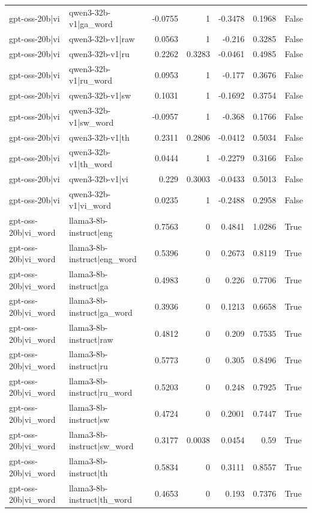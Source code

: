 \begin{table}
\begin{tabular}{l l r r r r l}
gpt-oss-20b|vi & qwen3-32b-v1|ga_word & -0.0755 & 1 & -0.3478 & 0.1968 & False \\
gpt-oss-20b|vi & qwen3-32b-v1|raw & 0.0563 & 1 & -0.216 & 0.3285 & False \\
gpt-oss-20b|vi & qwen3-32b-v1|ru & 0.2262 & 0.3283 & -0.0461 & 0.4985 & False \\
gpt-oss-20b|vi & qwen3-32b-v1|ru_word & 0.0953 & 1 & -0.177 & 0.3676 & False \\
gpt-oss-20b|vi & qwen3-32b-v1|sw & 0.1031 & 1 & -0.1692 & 0.3754 & False \\
gpt-oss-20b|vi & qwen3-32b-v1|sw_word & -0.0957 & 1 & -0.368 & 0.1766 & False \\
gpt-oss-20b|vi & qwen3-32b-v1|th & 0.2311 & 0.2806 & -0.0412 & 0.5034 & False \\
gpt-oss-20b|vi & qwen3-32b-v1|th_word & 0.0444 & 1 & -0.2279 & 0.3166 & False \\
gpt-oss-20b|vi & qwen3-32b-v1|vi & 0.229 & 0.3003 & -0.0433 & 0.5013 & False \\
gpt-oss-20b|vi & qwen3-32b-v1|vi_word & 0.0235 & 1 & -0.2488 & 0.2958 & False \\
gpt-oss-20b|vi_word & llama3-8b-instruct|eng & 0.7563 & 0 & 0.4841 & 1.0286 & True \\
gpt-oss-20b|vi_word & llama3-8b-instruct|eng_word & 0.5396 & 0 & 0.2673 & 0.8119 & True \\
gpt-oss-20b|vi_word & llama3-8b-instruct|ga & 0.4983 & 0 & 0.226 & 0.7706 & True \\
gpt-oss-20b|vi_word & llama3-8b-instruct|ga_word & 0.3936 & 0 & 0.1213 & 0.6658 & True \\
gpt-oss-20b|vi_word & llama3-8b-instruct|raw & 0.4812 & 0 & 0.209 & 0.7535 & True \\
gpt-oss-20b|vi_word & llama3-8b-instruct|ru & 0.5773 & 0 & 0.305 & 0.8496 & True \\
gpt-oss-20b|vi_word & llama3-8b-instruct|ru_word & 0.5203 & 0 & 0.248 & 0.7925 & True \\
gpt-oss-20b|vi_word & llama3-8b-instruct|sw & 0.4724 & 0 & 0.2001 & 0.7447 & True \\
gpt-oss-20b|vi_word & llama3-8b-instruct|sw_word & 0.3177 & 0.0038 & 0.0454 & 0.59 & True \\
gpt-oss-20b|vi_word & llama3-8b-instruct|th & 0.5834 & 0 & 0.3111 & 0.8557 & True \\
gpt-oss-20b|vi_word & llama3-8b-instruct|th_word & 0.4653 & 0 & 0.193 & 0.7376 & True \\

\end{tabular}
\end{table}
